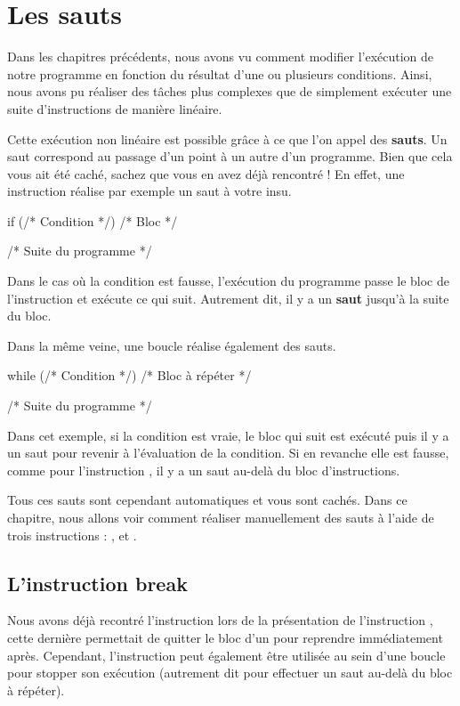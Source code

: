 \chapter{Les sauts}
\label{les-sauts}

Dans les chapitres précédents, nous avons vu comment modifier
l'exécution de notre programme en fonction du résultat d'une ou
plusieurs conditions. Ainsi, nous avons pu réaliser des tâches plus
complexes que de simplement exécuter une suite d'instructions de
manière linéaire.

Cette exécution non linéaire est possible grâce à ce que l'on appel
des \textbf{sauts}. Un saut correspond au passage d'un point à un
autre d'un programme. Bien que cela vous ait été caché, sachez que
vous en avez déjà rencontré ! En effet, une instruction 
réalise par exemple un saut à votre insu.

\begin{C}
  if (/* Condition */) { /* Bloc */ }

  /* Suite du programme */
\end{C}

Dans le cas où la condition est fausse, l'exécution du programme passe
le bloc de l'instruction  et exécute ce qui suit. Autrement
dit, il y a un \textbf{saut} jusqu'à la suite du bloc.

Dans la même veine, une boucle  réalise également des
sauts.

\begin{C}
  while (/* Condition */) { /* Bloc à répéter */ }

  /* Suite du programme */
\end{C}

Dans cet exemple, si la condition est vraie, le bloc qui suit est
exécuté puis il y a un saut pour revenir à l'évaluation de la
condition.  Si en revanche elle est fausse, comme pour l'instruction
, il y a un saut au-delà du bloc d'instructions.

Tous ces sauts sont cependant automatiques et vous sont cachés. Dans
ce chapitre, nous allons voir comment réaliser manuellement des sauts
à l'aide de trois instructions : ,  et
.

\section{L'instruction break}
\label{Linstruction-break}


Nous avons déjà recontré l'instruction  lors de la
présentation de l'instruction , cette dernière
permettait de quitter le bloc d'un  pour reprendre
immédiatement après.  Cependant, l'instruction  peut
également être utilisée au sein d'une boucle pour stopper son
exécution (autrement dit pour effectuer un saut au-delà du bloc à
répéter).

